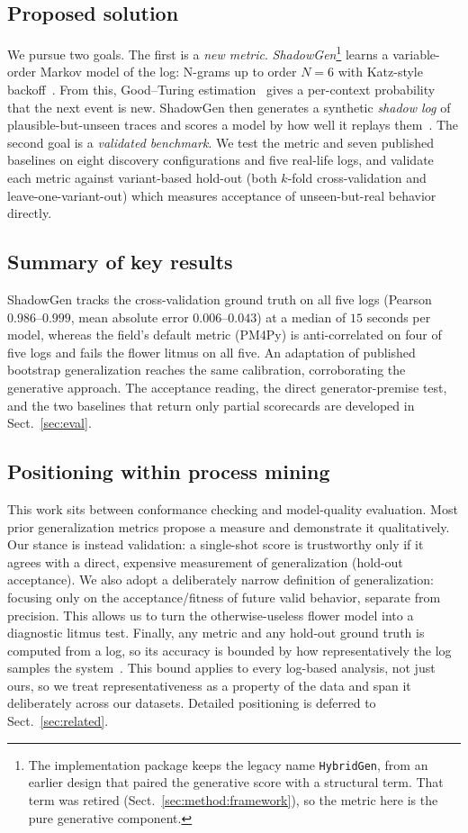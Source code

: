 \documentclass[runningheads]{llncs}
\newcommand{\chg}[1]{\textcolor{chgblue}{#1}}
\begin{document}
\subsection{Proposed solution}
We pursue two goals. The first is a \emph{new metric}. \emph{ShadowGen}\footnote{The implementation package keeps the legacy name \texttt{HybridGen}, from an earlier design that paired the generative score with a structural term. That term was retired (Sect.~\ref{sec:method:framework}), so the metric here is the pure generative component.} learns a variable-order Markov model of the log: N-grams up to order $N{=}6$ with Katz-style backoff~\cite{katz1987}. From this, Good--Turing estimation~\cite{gale1995gt} gives a per-context probability that the next event is new. ShadowGen then generates a synthetic \emph{shadow log} of plausible-but-unseen traces and scores a model by how well it replays them~\cite{rozinat2008conformance}. The second goal is a \emph{validated benchmark}. We test the metric \chg{and seven published baselines on eight discovery configurations and five real-life logs}, and validate each metric against variant-based hold-out (both $k$-fold cross-validation and leave-one-variant-out) which measures acceptance of unseen-but-real behavior directly.

\subsection{Summary of key results}
\chg{ShadowGen tracks the cross-validation ground truth on all five logs (Pearson $0.986$--$0.999$, mean absolute error $0.006$--$0.043$) at a median of $15$ seconds per model, whereas the field's default metric (PM4Py) is anti-correlated on four of five logs and fails the flower litmus on all five. An adaptation of published bootstrap generalization reaches the same calibration, corroborating the generative approach. The acceptance reading, the direct generator-premise test, and the two baselines that return only partial scorecards are developed in Sect.~\ref{sec:eval}.}

\subsection{Positioning within process mining}
This work sits between conformance checking and model-quality evaluation. Most prior generalization metrics propose a measure and demonstrate it qualitatively. Our stance is instead validation: a single-shot score is trustworthy only if it agrees with a direct, expensive measurement of generalization (hold-out acceptance). We also adopt a deliberately narrow definition of generalization: focusing only on the acceptance/fitness of future valid behavior, separate from precision. This allows us to turn the otherwise-useless flower model into a diagnostic litmus test. Finally, any metric and any hold-out ground truth is computed from a log, so its accuracy is bounded by how representatively the log samples the system~\cite{karunaratne2024representativeness}. This bound applies to every log-based analysis, not just ours, so we treat representativeness as a property of the data and span it deliberately across our datasets. Detailed positioning is deferred to Sect.~\ref{sec:related}.
\end{document}
